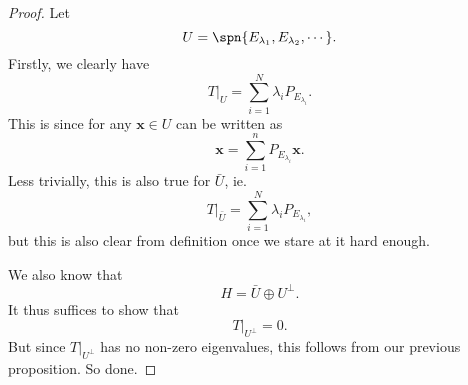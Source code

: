 \documentclass[a4paper]{article}
\begin{document}
\begin{proof}
  Let
  \[
    U = \spn\{E_{\lambda_1}, E_{\lambda_2}, \cdots\}.
  \]
  Firstly, we clearly have
  \[
    T|_U = \sum_{i = 1}^N \lambda_i P_{E_{\lambda_i}}.
  \]
  This is since for any $\mathbf{x} \in U$ can be written as
  \[
    \mathbf{x} = \sum_{i = 1}^n P_{E_{\lambda_i}} \mathbf{x}.
  \]
  Less trivially, this is also true for $\bar{U}$, ie.
  \[
    T|_{\bar{U}} = \sum_{i = 1}^N \lambda_i P_{E_{\lambda_i}},
  \]
  but this is also clear from definition once we stare at it hard enough.

  We also know that
  \[
    H = \bar{U} \oplus U^\perp.
  \]
  It thus suffices to show that
  \[
    T|_{U^\perp} = 0.
  \]
  But since $T|_{U^\perp}$ has no non-zero eigenvalues, this follows from our previous proposition. So done.
\end{proof}
\end{document}
